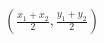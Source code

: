 \documentclass[preview]{standalone}
\begin{document}
\begin{align*}
\left(\frac{x_1 + x_2}{2}, \frac{y_1 + y_2}{2}\right)
\end{align*}
\end{document}
